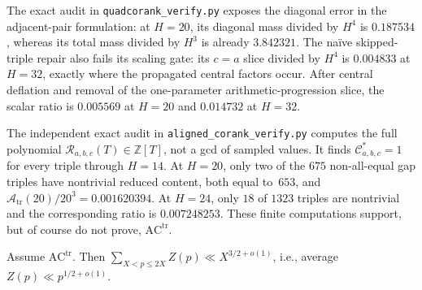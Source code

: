 \begin{remark}
The exact audit in \texttt{quadcorank\_verify.py} exposes the diagonal
error in the adjacent-pair formulation: at $H=20$, its diagonal mass
divided by $H^4$ is $0.187534$, whereas its total mass divided by
$H^3$ is already $3.842321$.  The na\"ive skipped-triple repair also
fails its scaling gate: its $c=a$ slice divided by $H^4$ is
$0.004833$ at $H=32$, exactly where the propagated central factors
occur.  After central deflation and removal of the one-parameter
arithmetic-progression slice, the scalar ratio is $0.005569$ at $H=20$
and $0.014732$ at $H=32$.

The independent exact audit in
\texttt{aligned\_corank\_verify.py} computes the full polynomial
$\mathcal R_{a,b,c}(T)\in\mathbb Z[T]$, not a gcd of sampled values.
It finds $\mathcal C^*_{a,b,c}=1$ for every triple through $H=14$.
At $H=20$, only two of the $675$ non-all-equal gap triples
have nontrivial reduced content, both equal to~$653$, and
$\mathcal A_{\mathrm{tr}}(20)/20^3=0.001620394$.  At $H=24$, only
$18$ of $1323$ triples are nontrivial and the corresponding ratio is
$0.007248253$.  These finite computations support, but of course do
not prove, $\mathrm{AC}^{\mathrm{tr}}$.
\end{remark}

\begin{theorem}\label{thm:qc-main}
Assume $\mathrm{AC}^{\mathrm{tr}}$.  Then
$\sum_{X<p\le2X}Z(p)\ll X^{3/2+o(1)}$,
i.e., average $Z(p)\ll p^{1/2+o(1)}$.
\end{theorem}

